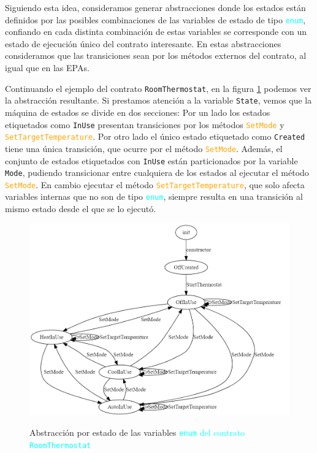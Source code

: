 Siguiendo esta idea, consideramos generar abstracciones donde los estados están definidos por las posibles combinaciones de las variables de estado de tipo \textcolor{cyan}{\texttt{enum}}, confiando en cada distinta combinación	de estas variables se corresponde con un estado de ejecución único del contrato interesante.
En estas abstracciones consideramos que las transiciones sean por los métodos externos del contrato, al igual que en las EPAs.

Continuando el ejemplo del contrato \texttt{RoomThermostat}, en la figura \ref{fig:room-thermostat-states} podemos ver la abstracción resultante.
Si prestamos atención a la variable \texttt{State}, vemos que la máquina de estados se divide en dos secciones:
Por un lado los estados etiquetados como \texttt{InUse} presentan transiciones por los métodos \textcolor{orange}{\texttt{SetMode}} y \textcolor{orange}{\texttt{SetTargetTemperature}}.
Por otro lado el único estado etiquetado como \texttt{Created} tiene una única transición, que ocurre por el método \textcolor{orange}{\texttt{SetMode}}.
Además, el conjunto de estados etiquetados con \texttt{InUse} están particionados por la variable \texttt{Mode}, pudiendo transicionar entre cualquiera de los estados al ejecutar el método \textcolor{orange}{\texttt{SetMode}}.
En cambio ejecutar el método \textcolor{orange}{\texttt{SetTargetTemperature}}, que solo afecta variables internas que no son de tipo \textcolor{cyan}{\texttt{enum}}, siempre resulta en una transición al mismo estado desde el que se lo ejecutó.

\begin{figure}[H]
    \centering
    {\includegraphics[width=\textwidth]{figs/room-thermostate-abstraction.png}}
    \caption{Abstracción por estado de las variables \textcolor{cyan}{\texttt{enum} del contrato \texttt{RoomThermostat}}}
    \label{fig:room-thermostat-states}
\end{figure}

